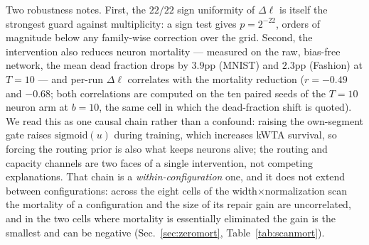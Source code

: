 \documentclass[10pt]{article}
\begin{document}
Two robustness notes. First, the $22/22$ sign uniformity of $\Delta\ell$
is itself the strongest guard against multiplicity: a sign test gives
$p = 2^{-22}$, orders of magnitude below any family-wise correction over
the grid. Second, the intervention also reduces neuron mortality ---
measured on the raw, bias-free network, the mean dead fraction drops by
$3.9$pp (MNIST) and $2.3$pp (Fashion) at $T{=}10$ --- and per-run
$\Delta\ell$ correlates with the mortality reduction ($r{=}-0.49$ and
$-0.68$; both correlations are computed on the ten paired seeds of the
$T{=}10$ neuron arm at $b{=}10$, the same cell in which the dead-fraction
shift is quoted). We read this as one causal chain rather than a confound:
raising the own-segment gate raises $\mathrm{sigmoid}(u)$ during
training, which increases kWTA survival, so forcing the routing prior is
also what keeps neurons alive; the routing and capacity channels are two
faces of a single intervention, not competing explanations. That chain is
a \emph{within-configuration} one, and it does not extend between
configurations: across the eight cells of the width$\times$normalization
scan the mortality of a configuration and the size of its repair gain are
uncorrelated, and in the two cells where mortality is essentially
eliminated the gain is the smallest and can be negative
(Sec.~\ref{sec:zeromort}, Table~\ref{tab:scanmort}).
\end{document}
